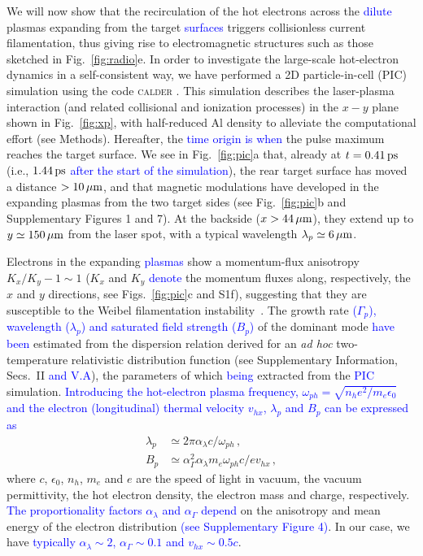 \documentclass[aps,showpacs,superscriptaddress]{revtex4}
\begin{document}
We will now show that the recirculation of the hot electrons across the \textcolor{blue}{dilute} plasmas expanding from the target \textcolor{blue}{surfaces} triggers collisionless current filamentation, thus giving rise to electromagnetic structures such as those sketched in Fig.~\ref{fig:radio}e. In order to investigate the large-scale hot-electron dynamics in a self-consistent way, we have performed a 2D particle-in-cell (PIC) simulation using the code \textsc{calder} \cite{NF_Lefebvre_2003}. This simulation describes the laser-plasma interaction (and related collisional and ionization processes) in the $x-y$ plane shown in Fig.~\ref{fig:xp}, with half-reduced Al density to alleviate the computational effort (see Methods). Hereafter, the \textcolor{blue}{time origin is when} the pulse maximum reaches the target surface. We see in Fig.~\ref{fig:pic}a that, already at $t=0.41\, \rm ps$ (i.e., $1.44\,\rm ps$ \textcolor{blue}{after the start of the simulation}), the rear target surface has moved a distance $>10\,\rm \mu m$, and that magnetic modulations have developed in the expanding plasmas from the two target sides (see Fig.~\ref{fig:pic}b and Supplementary Figures 1 and 7). At the backside ($x>44\,\rm \mu m$), they extend up to $y \simeq 150\,\rm \mu m$ from the laser spot, with a typical wavelength $\lambda_p \simeq 6\,\rm \mu m$.

Electrons in the expanding \textcolor{blue}{plasmas} show a momentum-flux anisotropy $K_x/K_y - 1 \sim 1$ ($K_x$ and $K_y$ \textcolor{blue}{denote} the momentum fluxes along, respectively, the $x$ and $y$ directions, see Figs.~\ref{fig:pic}c and S1f), suggesting that they are susceptible to the Weibel filamentation instability~\cite{POP_Ren_2006, PRL_Gode_2017}. The growth rate \textcolor{blue}{($\Gamma_p$), wavelength ($\lambda_p$) and saturated field strength ($B_p$)} of the dominant mode \textcolor{blue}{have been} estimated from the dispersion relation derived for an \emph{ad hoc} two-temperature relativistic distribution function
(see Supplementary Information, Secs.~II \textcolor{blue}{and V.A}), the parameters of which \textcolor{blue}{being} extracted from the \textcolor{blue}{PIC} simulation. \textcolor{blue}{Introducing the hot-electron plasma frequency, $\omega_{ph}=\sqrt{n_h e^2/m_e \epsilon_0}$ and the electron \textcolor{blue}{(longitudinal)} thermal velocity $v_{hx}$, $\lambda_p$ and $B_p$ can be expressed as}
\begin{align}
  \lambda_p &\simeq 2\pi \alpha_\lambda c/\omega_{ph} \label{eq:lp} \,,\\
  B_p &\simeq \alpha_\Gamma^2\alpha_\lambda m_e \omega_{ph}c/ev_{hx} \label{eq:bp} \,, 
\end{align}
where $c$, $\epsilon_0$, $n_h$, $m_e$ and $e$ are the speed of light in vacuum, the vacuum permittivity, the hot electron density, the electron mass and charge, respectively. \textcolor{blue}{The proportionality factors $\alpha_\lambda$ and $\alpha_\Gamma$ depend} on the anisotropy and mean energy of the electron distribution \textcolor{blue}{(see Supplementary Figure 4)}. In our case, we have \textcolor{blue}{typically $\alpha_\lambda \sim 2$, $\alpha_\Gamma \sim 0.1$ and $v_{hx} \sim 0.5 c$}.
\end{document}
